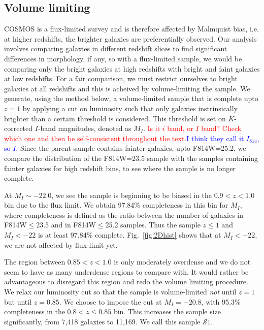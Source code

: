 \documentclass[twocolumn,useAMS,usenatbib]{mn2e}
\newcommand{\rachel}[1]{{\textcolor{red}{#1}}}
\newcommand{\arun}[1]{{\textcolor{blue}{#1}}}
\newcommand{\s}{\ensuremath{\mathcal{S}}}
\begin{document}
\subsection{Volume limiting}
\label{sub:volumelimiting}
COSMOS is a flux-limited survey and is therefore affected by Malmquist bias, i.e. at higher redshifts, the brighter galaxies are preferentially observed.
Our analysis involves comparing galaxies in different redshift slices to find significant differences in morphology, if any, so with a flux-limited sample, we would be comparing only the bright galaxies at high redshifts with
bright and faint galaxies at low redshifts. For a fair comparison, we must restrict ourselves to bright galaxies at all redshifts and this is acheived by volume-limiting the sample.
We generate, using the method below, a volume-limited sample that is complete upto $z=1$ by applying a cut on luminosity such that only galaxies instrinsically brighter than a certain threshold is considered. This threshold is set on $K$-corrected $I$-band magnitudes, denoted as $M_I$.
\rachel{Is it $i$ band, or $I$ band?  Check which one and then be  self-consistent throughout the text.}\arun{I think they call it $I_{814}$, so $I$.}
Since the parent sample contains fainter galaxies, upto F814W=25.2, we compare the distribution of the F814W=23.5 sample with the samples containing fainter galaxies for high redshift bins, to see where the sample is no longer complete.

At $M_I\sim-22.0$, we see the sample is beginning to be biased in the $0.9<z<1.0$ bin due to the flux limit. We obtain 97.84\% completeness in this bin for $M_I$, where completeness is defined as the ratio between the number of galaxies in F814W$\le$23.5 and in F814W$\le$25.2 samples.
Thus the sample $z\le1$ and $M_I<-22$ is at least 97.84\% complete. Fig.~\ref{fig:2Dhist} shows that at $M_I<-22$, we are not affected by flux limit yet. 

The region between $0.85<z<1.0$ is only moderately overdense and we do not seem to have as many underdense regions to compare with. It would rather be advantageous to disregard this region
and redo the volume limiting procedure.
We relax our luminosity cut %
so that the sample is volume-limited \emph{not} until $z=1$ but until $z=0.85$. 
We choose to impose the cut at $M_I=-20.8$, with 95.3\% completeness in the $0.8 < z \le 0.85$ bin. This increases the sample size significantly, from 7,418 galaxies to 11,169. We call this sample \s$1$.
\end{document}
